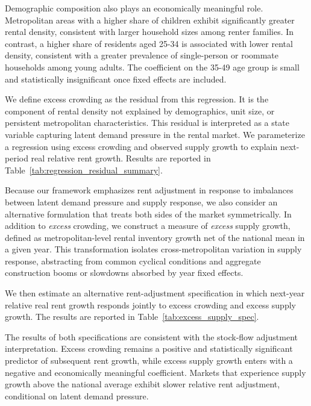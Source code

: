 \documentclass[pdflatex,sn-basic]{sn-jnl}%
\theoremstyle{thmstyleone}%
\theoremstyle{thmstyletwo}%
\theoremstyle{thmstylethree}%
\begin{document}
Demographic composition also plays an economically meaningful role. Metropolitan areas
with a higher share of children exhibit significantly greater rental density, consistent
with larger household sizes among renter families. In contrast, a higher share of residents
aged 25-34 is associated with lower rental density, consistent with a greater prevalence
of single-person or roommate households among young adults. The coefficient on the
35-49 age group is small and statistically insignificant once fixed effects are included.

We define excess crowding as the residual from this regression. It is the component
of rental density not explained by demographics, unit size, or persistent metropolitan
characteristics. This residual is interpreted as a state variable capturing latent demand
pressure in the rental market. We parameterize a regression using excess crowding and observed supply growth to explain next-period real relative rent growth. Results are reported in Table~\ref{tab:regression_residual_summary}.

Because our framework emphasizes rent adjustment in response to imbalances between
latent demand pressure and supply response, we also consider an alternative formulation
that treats both sides of the market symmetrically. In addition to \emph{excess} crowding, we
construct a measure of \emph{excess} supply growth, defined as metropolitan-level rental
inventory growth net of the national mean in a given year. This transformation isolates
cross-metropolitan variation in supply response, abstracting from common cyclical
conditions and aggregate construction booms or slowdowns absorbed by year fixed effects.

We then estimate an alternative rent-adjustment specification in which next-year relative
real rent growth responds jointly to excess crowding and excess supply growth. The results
are reported in Table~\ref{tab:excess_supply_spec}.

The results of both specifications are consistent with the stock-flow adjustment interpretation. Excess crowding remains a positive and statistically significant
predictor of subsequent rent growth, while excess supply growth enters with a negative and
economically meaningful coefficient. Markets that experience supply growth above the
national average exhibit slower relative rent adjustment, conditional on latent demand pressure.



\end{document}
